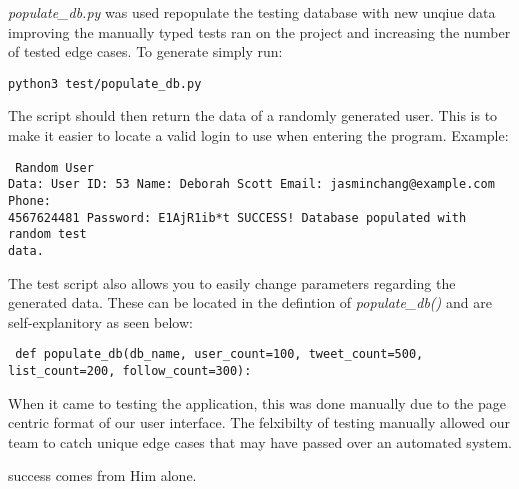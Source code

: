 \documentclass[11pt]{article}
\begin{document}

\textit{populate\_db.py} was used repopulate the testing database with new
unqiue data improving the manually typed tests ran on the project and increasing
the number of tested edge cases. To generate simply run: \begin{verbatim}
python3 test/populate_db.py \end{verbatim} The script should then return the
data of a randomly generated user. This is to make it easier to locate a valid
login to use when entering the program. Example: \begin{verbatim} Random User
Data: User ID: 53 Name: Deborah Scott Email: jasminchang@example.com Phone:
4567624481 Password: E1AjR1ib*t SUCCESS! Database populated with random test
data. \end{verbatim} The test script also allows you to easily change parameters
regarding the generated data. These can be located in the defintion of
\textit{populate\_db()} and are self-explanitory as seen below:
\begin{lstlisting} def populate_db(db_name, user_count=100, tweet_count=500,
list_count=200, follow_count=300): \end{lstlisting} When it came to testing the
application, this was done manually due to the page centric format of our user
interface. The felxibilty of testing manually allowed our team to catch unique
edge cases that may have passed over an automated system. %

success comes from Him alone. 
\end{document}

